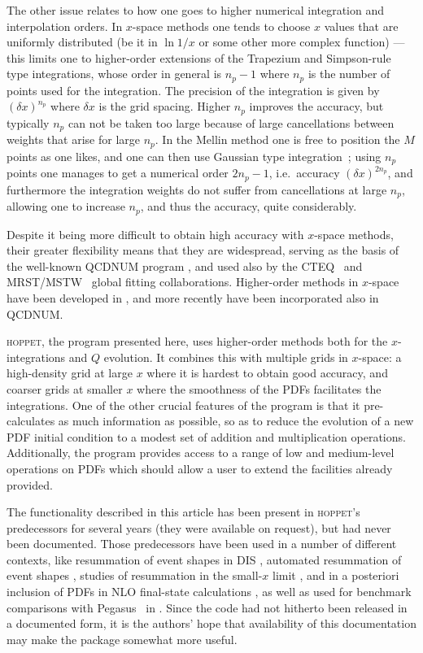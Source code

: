 \documentclass[12pt]{article}
\newcommand{\lp}{\left(}
\newcommand{\rp}{\right)}
\newcommand{\ie}{i.e.\ }
\newcommand{\hoppet}{\textsc{hoppet}\xspace}
\begin{document}
The other issue relates to how one goes to higher numerical
integration and interpolation orders.
In $x$-space methods one tends to choose $x$ values that are uniformly
distributed (be it in $\ln 1/x$ or some other more complex function)
--- this limits one to higher-order extensions of the Trapezium and
Simpson-rule type integrations, whose order in general is $n_p-1$
where $n_p$ is the number of points used for the integration. The
precision of the integration is given by $\lp\delta x\rp^{n_p}$ where
$\delta x$ is the grid spacing. Higher $n_p$ improves the accuracy,
but typically $n_p$ can not be taken too large because of large
cancellations between weights that arise for large $n_p$.
%
%
In the Mellin method one is free to position the $M$ points as one
likes, and one can then use Gaussian type
integration~\cite{Weinzierl:2002mv,Pegasus,Kosower:1997hg}; using $n_p$
points one manages to get a numerical order $2n_p-1$, \ie accuracy
$\lp \delta x\rp^{2n_p}$, and furthermore the integration weights do not suffer
from cancellations at large $n_p$, allowing one to increase
$n_p$, and thus the accuracy, quite considerably.

Despite it being more difficult to obtain high accuracy with $x$-space
methods, their greater flexibility means that they are widespread,
serving as the basis of the well-known  QCDNUM program \cite{Botje},
and  used also by the CTEQ~\cite{CTEQ} and MRST/MSTW~\cite{MRST}
global fitting
collaborations. Higher-order methods in $x$-space have been developed
in \cite{Schoeffel:1998tz,Pascaud:2001bi,coriano,GuzziThesis,DisResum}, and
more recently have been incorporated also in QCDNUM.

\hoppet, the program presented here, uses higher-order methods both for
the $x$-integrations and $Q$ evolution. It combines this with multiple
grids in $x$-space: a high-density grid at large $x$ where it is
hardest to obtain good accuracy, and coarser grids at smaller $x$
where the smoothness of the PDFs facilitates the integrations. One of
the other crucial features of the program is that it pre-calculates as
much information as possible, so as to reduce the 
evolution of a new PDF initial condition to a modest set of addition
and multiplication operations. Additionally, the program provides
access to a range of low and medium-level operations on PDFs which
should allow a user to extend the facilities already provided.


The functionality described in this article has been present in
\hoppet's predecessors for several years (they were available on
request), but had
never been documented. 
Those predecessors have  been used in a number of different
contexts, like resummation of event shapes
in DIS \cite{DisResum}, automated resummation
of event shapes \cite{caesar}, studies of
resummation in the small-$x$ limit \cite{Ciafaloni:2003rd}, 
and in a posteriori inclusion
of PDFs in NLO final-state calculations \cite{APPL,Banfi:2007gu}, as well
as  used for benchmark
comparisons with Pegasus~\cite{Pegasus} in \cite{Benchmarks}.
Since the code had
not hitherto been released in a documented form, 
it is the authors' hope that availability of
this documentation may make the package somewhat more useful.
\end{document}
